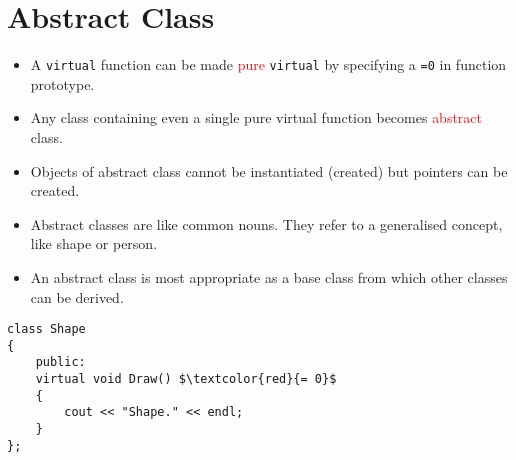 \documentclass[12pt,a4paper]{article}
\begin{document}
\section{Abstract Class}
\begin{itemize}
\item A \verb|virtual| function can be made \textcolor{red}{pure} \verb|virtual| by specifying a \verb|=0| in function prototype.
\item Any class containing even a single pure virtual function becomes \textcolor{red}{abstract} class.
\item Objects of abstract class cannot be instantiated (created) but pointers can be created.
\item Abstract classes are like common nouns. They refer to a generalised concept, like shape or person.
\item An abstract class is most appropriate as a base class from which other classes can be derived.
\end{itemize}
\begin{lstlisting}[caption={Making Shape class abstract}, escapechar=$]
class Shape
{
	public:
	virtual void Draw() $\textcolor{red}{= 0}$
	{
		cout << "Shape." << endl;
	}
};
\end{lstlisting}
%
%
\end{document}
